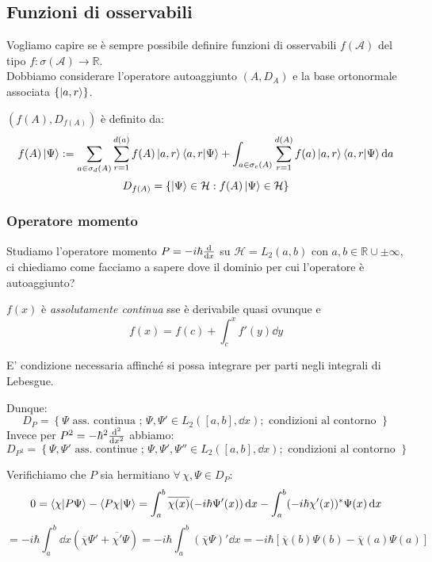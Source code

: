 \subsection{Funzioni di osservabili}

Vogliamo capire se è sempre possibile definire funzioni di osservabili \(f(\mathcal{A})\) del tipo \(f : \sigma(\mathcal{A})\to \mathbb{R}\).\\
Dobbiamo considerare l'operatore autoaggiunto \((A, D_A)\) e la base ortonormale associata \(\left\{ \ket{a,r} \right\}\).

\begin{definition}
    \((f(A), D_{f(A)})\) è definito da:
    \begin{equation}
        f(A)\ket{\Psi}:= \sum_{a \in \sigma_d(A)} \sum_{r=1}^{d(a)} f(A)\ket{a,r}\braket{a,r}{\Psi} + 
        \int_{a \in \sigma_c(A)} \sum_{r=1}^{d(A)} f(a)\ket{a,r}\braket{a,r}{\Psi} \dd{a}
    \end{equation}
    \[
      D_{f(A)} = \left\{ \ket{\Psi} \in \mathcal{H} : f(A)\ket{\Psi} \in \mathcal{H} \right\}  
    \]
\end{definition}


\subsubsection{Operatore momento}
Studiamo l'operatore momento \(P = -i\hbar \dv{x}\) su \(\mathcal{H} = L_2 ( a, b)\) con \(a,b \in \mathbb{R}\cup \pm \infty\), 
ci chiediamo come facciamo a sapere dove il dominio per cui l'operatore è autoaggiunto?

\begin{definition}
    \(f(x)\) è \textit{assolutamente continua} sse è derivabile quasi ovunque e \[
        f(x) = f(c)+ \int_{c}^{x}f'(y) \dd{y}
    \]
\end{definition}

\begin{remark}
    E' condizione necessaria affinché si possa integrare per parti negli integrali di Lebesgue.
\end{remark}

Dunque:
\[
    D_P= \left\{ \Psi \text{ ass. continua } ;\, \Psi, \Psi' \in L_2([a,b],\dd{x}); \text{ condizioni al contorno }\right\}
\]
Invece per \(P^2 = -\hbar^2 \dv[2]{}{x}\) abbiamo:
\[
    D_{P^2} = \left\{ \Psi, \Psi' \text{ ass. continue } ; \, \Psi,\Psi',\Psi'' \in L_2([a,b],\dd{x}); \text{ condizioni al contorno }\right\}
\]

Verifichiamo che \(P\) sia hermitiano \(\forall\, \chi, \Psi \in D_P\):
\[
    0 = \braket{\chi}{P\Psi} - \braket{P\chi}{\Psi} =   \int_{a}^{b} \overline{\chi(x)}(-i\hbar \Psi'(x))\dd{x} - \int_{a}^{b}(-i\hbar \chi'(x))^* \Psi(x) \dd{x}
\]
\[
    = -i\hbar \int_{a}^{b}\dd{x} ( \overline{\chi}\Psi' + \overline{\chi'}\Psi)= -i\hbar\int_{a}^{b}( \overline{\chi}\Psi)' \dd{x}   = -i\hbar\left[ \overline{\chi}(b)\Psi(b)- \overline{\chi}(a)\Psi(a) \right]
\]


